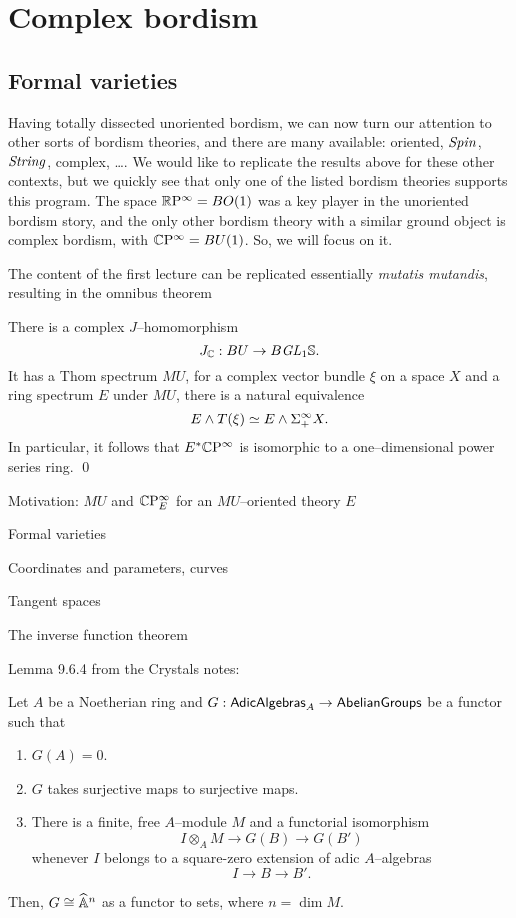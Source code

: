 
\chapter{Complex bordism}



\section{Formal varieties}

Having totally dissected unoriented bordism, we can now turn our attention to other sorts of bordism theories, and there are many available: oriented, $\mathit{Spin}$, $\mathit{String}$, complex, \ldots.  We would like to replicate the results above for these other contexts, but we quickly see that only one of the listed bordism theories supports this program.  The space $\mathbb R\mathrm P^\infty = BO(1)$ was a key player in the unoriented bordism story, and the only other bordism theory with a similar ground object is complex bordism, with $\mathbb{C}\mathrm P^\infty = BU(1)$.  So, we will focus on it.

The content of the first lecture can be replicated essentially \textit{mutatis mutandis}, resulting in the omnibus theorem
\begin{theorem}
There is a complex $J$--homomorphism \[J_{\mathbb{C}}: BU \to B \mathit{GL}_1 \mathbb S.\]  It has a Thom spectrum $MU$, for a complex vector bundle $\xi$ on a space $X$ and a ring spectrum $E$ under $MU$, there is a natural equivalence \[E \wedge T(\xi) \simeq E \wedge \Sigma^\infty_+ X.\]  In particular, it follows that $E^* \mathbb{C}\mathrm P^\infty$ is isomorphic to a one--dimensional power series ring. \qed
\end{theorem}

Motivation: $MU$ and $\mathbb{C}\mathrm P^\infty_E$ for an $MU$--oriented theory $E$

Formal varieties

Coordinates and parameters, curves

Tangent spaces

The inverse function theorem

Lemma 9.6.4 from the Crystals notes:

\begin{theorem}
Let $A$ be a Noetherian ring and $G: \mathsf{AdicAlgebras}_A \to \mathsf{AbelianGroups}$ be a functor such that
\begin{enumerate}
\item $G(A) = 0$.
\item $G$ takes surjective maps to surjective maps.
\item There is a finite, free $A$--module $M$ and a functorial isomorphism \[I \otimes_A M \to G(B) \to G(B')\] whenever $I$ belongs to a square-zero extension of adic $A$--algebras \[I \to B \to B'.\]
\end{enumerate}
Then, $G \cong \widehat{\mathbb{A}}^n$ as a functor to sets, where $n = \dim M$.
\end{theorem}

